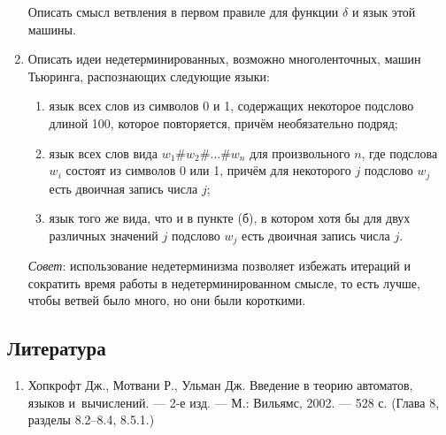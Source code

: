\documentclass[12pt,a4paper]{article}
\begin{document}
\begin{enumerate}
\begin{multicols}{2}
  \end{multicols}
Описать смысл ветвления в первом правиле для функции $\delta$ и язык этой машины.

\item Описать идеи недетерминированных, возможно многоленточных, машин Тьюринга, распознающих
следующие языки:
\begin{enumerate}
\item язык всех слов из символов 0 и 1, содержащих некоторое подслово длиной 100, которое повторяется, причём необязательно подряд;
\item язык всех слов вида $w_1\#w_2\#\dots\#w_n$ для произвольного $n$, где подслова 
$w_i$ состоят из символов 0 или 1, причём для некоторого  $j$ подслово $w_j$ есть двоичная запись числа $j$;
\item язык того же вида, что и в пункте (б), в котором хотя бы для двух различных значений $j$ подслово $w_j$ есть двоичная запись числа $j$.
\end{enumerate}
\emph{Совет}: использование недетерминизма позволяет избежать итераций и сократить время 
работы в недетерминированном смысле, то есть лучше, чтобы ветвей было много, но они были 
короткими.




\end{enumerate}

\subsection*{Литература}
\begin{enumerate}
\item Хопкрофт Дж., Мотвани Р., Ульман Дж. Введение в теорию автоматов, языков и~вычислений. — 2-е изд. — М.: Вильямс, 2002. — 528 с. (Глава 8, разделы 8.2--8.4, 8.5.1.)
\end{enumerate}
\end{document}
